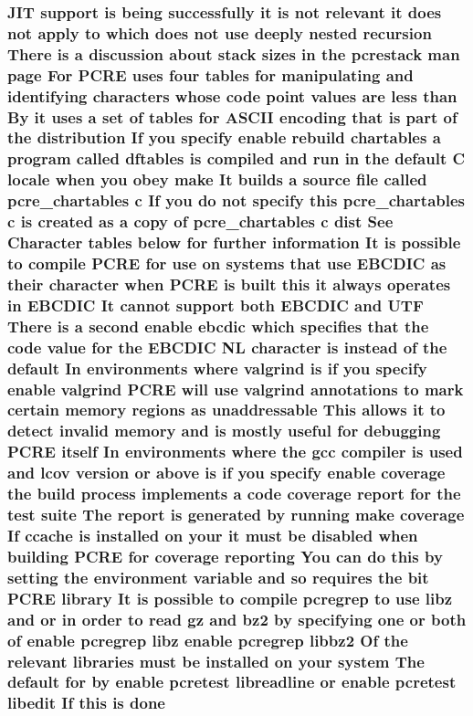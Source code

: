 \subsubsection[{\texorpdfstring{done}{done}}]{ J\+IT {\bf support} {\bf is} being successfully {\bf it} {\bf is} {\bf not} relevant {\bf it} does {\bf not} apply {\bf to} {\bf which} does {\bf not} use deeply nested {\bf recursion} There {\bf is} {\bf a} discussion about {\bf stack} sizes {\bf in} the pcrestack {\bf man} page For {\bf P\+C\+RE} uses four {\bf tables} for manipulating and identifying {\bf characters} whose {\bf code} {\bf point} {\bf values} {\bf are} less {\bf than} By {\bf it} uses {\bf a} {\bf set} {\bf of} {\bf tables} for {\bf A\+S\+C\+II} {\bf encoding} that {\bf is} part {\bf of} the distribution If you specify enable rebuild {\bf chartables} {\bf a} {\bf program} called {\bf dftables} {\bf is} {\bf compiled} and {\bf run} {\bf in} the {\bf default} {\bf C} {\bf locale} when you obey {\bf make} It builds {\bf a} {\bf source} {\bf file} called pcre\+\_\+chartables {\bf c} If you {\bf do} {\bf not} specify {\bf this} pcre\+\_\+chartables {\bf c} {\bf is} created {\bf as} {\bf a} copy {\bf of} pcre\+\_\+chartables {\bf c} {\bf dist} See Character {\bf tables} {\bf below} for further information It {\bf is} {\bf possible} {\bf to} {\bf compile} {\bf P\+C\+RE} for use {\bf on} {\bf systems} that use E\+B\+C\+D\+IC {\bf as} their {\bf character} when {\bf P\+C\+RE} {\bf is} {\bf built} {\bf this} {\bf it} always operates {\bf in} E\+B\+C\+D\+IC It cannot {\bf support} both E\+B\+C\+D\+IC and U\+TF There {\bf is} {\bf a} {\bf second} enable ebcdic {\bf which} specifies that the {\bf code} {\bf value} for the E\+B\+C\+D\+IC {\bf NL} {\bf character} {\bf is} instead {\bf of} the {\bf default} In {\bf environments} {\bf where} valgrind {\bf is} {\bf if} you specify enable valgrind {\bf P\+C\+RE} will use valgrind annotations {\bf to} {\bf mark} certain {\bf memory} regions {\bf as} unaddressable This allows {\bf it} {\bf to} detect invalid {\bf memory} and {\bf is} mostly useful for debugging {\bf P\+C\+RE} {\bf itself} In {\bf environments} {\bf where} the {\bf gcc} {\bf compiler} {\bf is} {\bf used} and lcov version {\bf or} {\bf above} {\bf is} {\bf if} you specify enable coverage the build {\bf process} implements {\bf a} {\bf code} coverage report for the test suite The report {\bf is} {\bf generated} by running {\bf make} coverage If ccache {\bf is} {\bf installed} {\bf on} your {\bf it} must {\bf be} disabled when building {\bf P\+C\+RE} for coverage reporting You {\bf can} {\bf do} {\bf this} by {\bf setting} the {\bf environment} variable and {\bf so} requires the {\bf bit} {\bf P\+C\+RE} {\bf library} It {\bf is} {\bf possible} {\bf to} {\bf compile} pcregrep {\bf to} use libz and {\bf or} {\bf in} {\bf order} {\bf to} {\bf read} gz and {\bf bz2} by {\bf specifying} one {\bf or} both {\bf of} enable pcregrep libz enable pcregrep {\bf libbz2} Of the relevant {\bf libraries} must {\bf be} {\bf installed} {\bf on} your {\bf system} The {\bf default} for by enable {\bf pcretest} libreadline {\bf or} enable {\bf pcretest} libedit If {\bf this} {\bf is} done}\hypertarget{README_8txt_aab36b2734b1c834ca42fc771a40b98ef}{}\label{README_8txt_aab36b2734b1c834ca42fc771a40b98ef}
